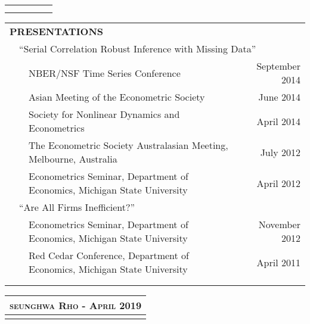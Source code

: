 \documentclass[10pt]{article}
\begin{document}
\begin{center}
\begin{tabular}{llllr}
\multicolumn{5}{p{500pt}}{}\\\\
\end{tabular}
\begin{tabular}{llllr}
\multicolumn{5}{l}{{\Large \textbf{P}}\textbf{RESENTATIONS}}\vspace{0.1cm}\\
&\multicolumn{4}{l}{\textquotedblleft Serial Correlation
Robust Inference with Missing Data\textquotedblright } \\
\multicolumn{1}{l}{} & \multicolumn{1}{l}{} & \multicolumn{2}{l}{
NBER/NSF Time Series Conference} &\multicolumn{1}{r}{September 2014}\\
\multicolumn{1}{l}{} & \multicolumn{1}{l}{} & \multicolumn{2}{l}{
Asian Meeting of the Econometric Society} &\multicolumn{1}{r}{June 2014}\\
\multicolumn{1}{l}{} & \multicolumn{1}{l}{} & \multicolumn{2}{l}{
Society for Nonlinear Dynamics and Econometrics} &\multicolumn{1}{r}{April 2014}\\
\multicolumn{1}{l}{} & \multicolumn{1}{l}{} & \multicolumn{2}{l}{
The Econometric Society Australasian Meeting, Melbourne, Australia} &\multicolumn{1}{r}{July 2012}\\
\multicolumn{1}{l}{} & \multicolumn{1}{l}{} & \multicolumn{2}{l}{
Econometrics Seminar, Department of Economics, Michigan State University} &\multicolumn{1}{r}{April 2012}\vspace{0.2cm}\\
& \multicolumn{4}{l}{ \textquotedblleft Are All Firms Inefficient?\textquotedblright}\\
\multicolumn{1}{l}{} & \multicolumn{1}{l}{} & \multicolumn{2}{l}{
Econometrics Seminar, Department of Economics, Michigan State University} &\multicolumn{1}{r}{November 2012}\\
\multicolumn{1}{l}{} & \multicolumn{1}{l}{} & \multicolumn{2}{l}{
Red Cedar Conference, Department of Economics, Michigan State University} &\multicolumn{1}{r}{April 2011} \\
\multicolumn{5}{p{500pt}}{}\\\\
\end{tabular}
\clearpage

\begin{tabular}{llllr}
\multicolumn{5}{r}{\textsc{seunghwa Rho - April 2019}} \\ \hline
\multicolumn{5}{p{500pt}}{}\\
\end{tabular}


\end{center}
\end{document}
